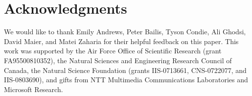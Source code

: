 \section*{Acknowledgments}
We would like to thank Emily Andrews, Peter Bailis, Tyson Condie, Ali Ghodsi,
David Maier, and Matei Zaharia for their helpful feedback on this paper.  This
work was supported by the Air Force Office of Scientific Research (grant
FA95500810352), the Natural Sciences and Engineering Research Council of Canada,
the Natural Science Foundation (grants IIS-0713661, CNS-0722077, and
IIS-0803690), and gifts from NTT Multimedia Communications Laboratories and
Microsoft Research.
